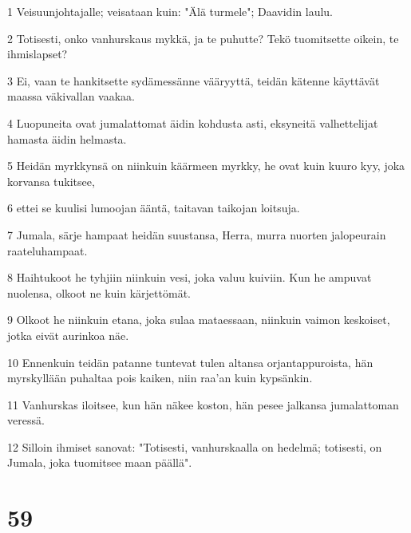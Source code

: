 \par 1 Veisuunjohtajalle; veisataan kuin: "Älä turmele"; Daavidin laulu.
\par 2 Totisesti, onko vanhurskaus mykkä, ja te puhutte? Tekö tuomitsette oikein, te ihmislapset?
\par 3 Ei, vaan te hankitsette sydämessänne vääryyttä, teidän kätenne käyttävät maassa väkivallan vaakaa.
\par 4 Luopuneita ovat jumalattomat äidin kohdusta asti, eksyneitä valhettelijat hamasta äidin helmasta.
\par 5 Heidän myrkkynsä on niinkuin käärmeen myrkky, he ovat kuin kuuro kyy, joka korvansa tukitsee,
\par 6 ettei se kuulisi lumoojan ääntä, taitavan taikojan loitsuja.
\par 7 Jumala, särje hampaat heidän suustansa, Herra, murra nuorten jalopeurain raateluhampaat.
\par 8 Haihtukoot he tyhjiin niinkuin vesi, joka valuu kuiviin. Kun he ampuvat nuolensa, olkoot ne kuin kärjettömät.
\par 9 Olkoot he niinkuin etana, joka sulaa mataessaan, niinkuin vaimon keskoiset, jotka eivät aurinkoa näe.
\par 10 Ennenkuin teidän patanne tuntevat tulen altansa orjantappuroista, hän myrskyllään puhaltaa pois kaiken, niin raa'an kuin kypsänkin.
\par 11 Vanhurskas iloitsee, kun hän näkee koston, hän pesee jalkansa jumalattoman veressä.
\par 12 Silloin ihmiset sanovat: "Totisesti, vanhurskaalla on hedelmä; totisesti, on Jumala, joka tuomitsee maan päällä".

\chapter{59}

